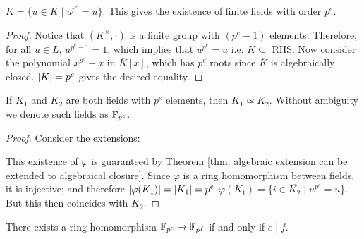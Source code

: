 \documentclass{article}
\begin{document}
\begin{claim}\label{clm: fields with p^e elements}
    $K = \{u \in \overline{K} \mid u^{p^e} = u\}$. This gives the existence of finite fields with order $p^e$.
\end{claim}

\begin{proof}
    Notice that $(K^{\times}, \cdot)$ is a finite group with $(p^e - 1)$ elements. Therefore, for all $u \in L$, $u^{p^e - 1} = 1$, which implies that $u^{p^e} = u$ i.e. $K \subseteq $ RHS. Now consider the polynomial $x^{p^e} - x$ in $\overline{K}[x]$, which has $p^e$ roots since $\overline{K}$ is algebraically closed. $\left|K\right| = p^e$ gives the desired equality.
\end{proof}

\begin{proposition}\label{prop: F_pe are isomorphic}
    If $K_1$ and $K_2$ are both fields with $p^e$ elements, then $K_1 \simeq K_2$. Without ambiguity we denote such fields as $\mathbb{F}_{p^e}$.
\end{proposition}

\begin{proof}
    Consider the extensions:

    \begin{minipage}{\linewidth}
        \centering
    \end{minipage}

    This existence of $\varphi$ is guaranteed by Theorem \ref{thm: algebraic extension can be extended to algebraical closure}. Since $\varphi$ is a ring homomorphism between fields, it is injective; and therefore $\left|\varphi(K_1)\right| = \left|K_1\right| = p^e$ \implies $\varphi(K_1) = \{i \in \overline{K_2} \mid u^{p^e} = u\}$. But this then coincides with $K_2$.
\end{proof}

\begin{example}\label{ex: f_pe extends to f_pf iff e divides f}
    There exists a ring homomorphism $\mathbb{F}_{p^e} \to \mathbb{F}_{p^f}$ if and only if $e \mid f$. 
\end{example}
    
\end{document}
